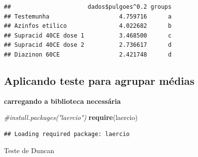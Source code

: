 \documentclass[
]{book}
\newenvironment{Shaded}{\begin{snugshade}}{\end{snugshade}}
\newcommand{\CharTok}[1]{\textcolor[rgb]{0.31,0.60,0.02}{#1}}
\newcommand{\CommentTok}[1]{\textcolor[rgb]{0.56,0.35,0.01}{\textit{#1}}}
\newcommand{\DataTypeTok}[1]{\textcolor[rgb]{0.13,0.29,0.53}{#1}}
\newcommand{\KeywordTok}[1]{\textcolor[rgb]{0.13,0.29,0.53}{\textbf{#1}}}
\newcommand{\NormalTok}[1]{#1}
\newcommand{\OperatorTok}[1]{\textcolor[rgb]{0.81,0.36,0.00}{\textbf{#1}}}
\newcommand{\StringTok}[1]{\textcolor[rgb]{0.31,0.60,0.02}{#1}}
\begin{document}
\begin{Shaded}
\end{Shaded}

\begin{verbatim}
##                      dados$pulgoes^0.2 groups
## Testemunha                    4.759716      a
## Azinfos etilico               4.022682      b
## Supracid 40CE dose 1          3.468500      c
## Supracid 40CE dose 2          2.736617      d
## Diazinon 60CE                 2.421748      d
\end{verbatim}

\begin{Shaded}
\end{Shaded}

\hypertarget{aplicando-teste-para-agrupar-muxe9dias}{%
\subsection{Aplicando teste para agrupar médias}\label{aplicando-teste-para-agrupar-muxe9dias}}

\textbf{carregando a biblioteca necessária}

\begin{Shaded}
\begin{Highlighting}[]
\CommentTok{#install.packages("laercio")}
\KeywordTok{require}\NormalTok{(laercio)}
\end{Highlighting}
\end{Shaded}

\begin{verbatim}
## Loading required package: laercio
\end{verbatim}

Teste de Duncan

\begin{Shaded}
\end{Shaded}
\end{document}

